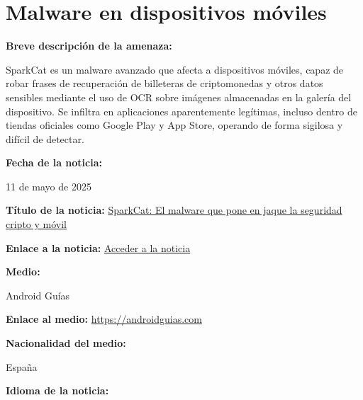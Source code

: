 \chapter{Malware en dispositivos móviles}

\begin{tcolorbox}[
    title=Detalles de la Noticia, 
    colframe=black,
    colback=gray!5,
    sharp corners,
    breakable
]

    \textbf{Breve descripción de la amenaza:}
    \vspace{0.5em}
    
    SparkCat es un malware avanzado que afecta a dispositivos móviles, capaz de robar frases de recuperación de billeteras de criptomonedas y otros datos sensibles mediante el uso de OCR sobre imágenes almacenadas en la galería del dispositivo. Se infiltra en aplicaciones aparentemente legítimas, incluso dentro de tiendas oficiales como Google Play y App Store, operando de forma sigilosa y difícil de detectar.

    \vspace{0.5em}

    \textbf{Fecha de la noticia:}
    \vspace{0.5em}
    
    11 de mayo de 2025

    \textbf{Título de la noticia:}
    \vspace{0.5em}
    \href{https://androidguias.com/descubre-el-malware-sparkcat-y-sus-riesgos/}{SparkCat: El malware que pone en jaque la seguridad cripto y móvil}

    \textbf{Enlace a la noticia:}
    \vspace{0.5em}
    \href{https://androidguias.com/descubre-el-malware-sparkcat-y-sus-riesgos/}{Acceder a la noticia}

    \textbf{Medio:}
    \vspace{0.5em}
    
    Android Guías

    \textbf{Enlace al medio:}
    \vspace{0.5em}
    \href{https://androidguias.com}{https://androidguias.com}

    \textbf{Nacionalidad del medio:}
    \vspace{0.5em}
    
    España

    \textbf{Idioma de la noticia:}
    \vspace{0.5em}
    

\end{tcolorbox}
